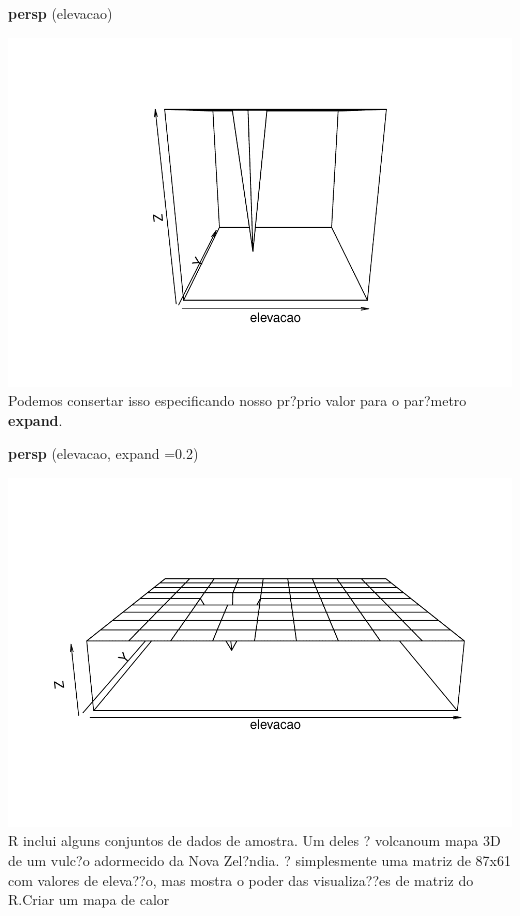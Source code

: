 \documentclass[]{book}
\newenvironment{Shaded}{\begin{snugshade}}{\end{snugshade}}
\newcommand{\DataTypeTok}[1]{\textcolor[rgb]{0.13,0.29,0.53}{#1}}
\newcommand{\FloatTok}[1]{\textcolor[rgb]{0.00,0.00,0.81}{#1}}
\newcommand{\KeywordTok}[1]{\textcolor[rgb]{0.13,0.29,0.53}{\textbf{#1}}}
\newcommand{\NormalTok}[1]{#1}
\begin{document}
\begin{Shaded}
\begin{Highlighting}[]
\KeywordTok{persp}\NormalTok{ (elevacao)}
\end{Highlighting}
\end{Shaded}

\includegraphics{TudodoR_files/figure-latex/unnamed-chunk-72-1.pdf}
Podemos consertar isso especificando nosso pr?prio valor para o par?metro \textbf{expand}.

\begin{Shaded}
\begin{Highlighting}[]
\KeywordTok{persp}\NormalTok{ (elevacao, }\DataTypeTok{expand =}\FloatTok{0.2}\NormalTok{)}
\end{Highlighting}
\end{Shaded}

\includegraphics{TudodoR_files/figure-latex/unnamed-chunk-73-1.pdf}
R inclui alguns conjuntos de dados de amostra. Um deles ? volcanoum mapa 3D de um vulc?o adormecido da Nova Zel?ndia.
? simplesmente uma matriz de 87x61 com valores de eleva??o, mas mostra o poder das visualiza??es de matriz do R.Criar um mapa de calor
\end{document}
